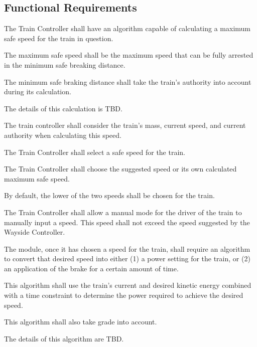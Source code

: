 \documentclass{scrreprt}
\begin{document}
\subsection{Functional Requirements}
\begin{numonly}
    \item The Train Controller shall have an algorithm capable of calculating a maximum safe speed for the train in question.
    \begin{numonly}
        \item The maximum safe speed shall be the maximum speed that can be fully arrested in the minimum safe breaking distance.
                \begin{numonly}
                    \item The minimum safe braking distance shall take the train's authority into account during its calculation.
                    \item The details of this calculation is TBD.
                \end{numonly}
        \item The train controller shall consider the train's mass, current speed, and current authority when calculating this speed.
    \end{numonly}

    \item The Train Controller shall select a safe speed for the train.
    \begin{numonly}
        \item The Train Controller shall choose the suggested speed or its own calculated maximum safe speed.
        \item By default, the lower of the two speeds shall be chosen for the train.
        \item The Train Controller shall allow a manual mode for the driver of the train to manually input a speed.  This speed shall not exceed the speed suggested by the Wayside Controller.
    \end{numonly}

    \item The module, once it has chosen a speed for the train, shall require an algorithm to convert that desired speed into either (1) a power setting for the train, or (2) an application of the brake for a certain amount of time.
    \begin{numonly}
        \item This algorithm shall use the train's current and desired kinetic energy combined with a time constraint to determine the power required to achieve the desired speed.
        \item This algorithm shall also take grade into account.
        \item The details of this algorithm are TBD.
    \end{numonly}


\end{numonly}
\end{document}
